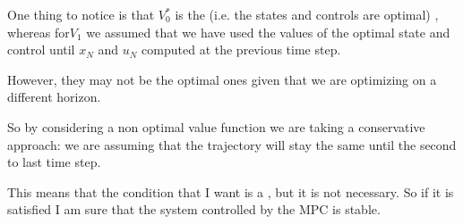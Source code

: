 One thing to notice is that $V_0^*$ is the  (i.e. the states and controls are optimal) , whereas for$V_1$ we assumed that we have used the values of the optimal state and control until $x_N$ and $u_N$ computed at the previous time step.

However, they may not be the optimal ones given that we are optimizing on a different horizon.

So by considering a non optimal value function we are taking a conservative approach: we are assuming that the trajectory will stay the same until the second to last time step.

This means that the condition that I want is a , but it is not necessary. So if it is satisfied I am sure that the system controlled by the MPC is stable.

